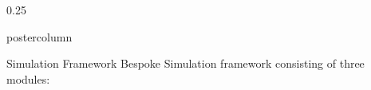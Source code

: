 \documentclass[final,hyperref={pdfpagelabels=false}]{beamer}
\def\colwidth{0.25\linewidth}
\begin{document}
\begin{frame}[fragile]
\begin{columns}[t]
\begin{column}{\colwidth}
\begin{beamercolorbox}[center,wd=\textwidth]{postercolumn}
\begin{minipage}[T]{.98\textwidth}
{%

            \begin{block}{Simulation Framework}
              Bespoke Simulation framework consisting of three modules:
              \begin{itemize}

\end{itemize}
\end{block}}
\end{minipage}
\end{beamercolorbox}
\end{column}
\end{columns}
\end{frame}
\end{document}
